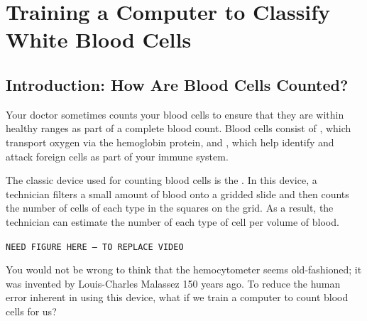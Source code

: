 \chapter[Training a Computer to Classify White Blood Cells]{Training a Computer to Classify White Blood Cells}
\label{chapter:white_blood_cells}
\renewcommand{\chaptertitle}{Training a Computer to Classify White Blood Cells}



\FloatBarrier

\section{Introduction: How Are Blood Cells Counted?}
\label{sec:introduction}

Your doctor sometimes counts your blood cells to ensure that they are within healthy ranges as part of a complete blood count. Blood cells consist of , which transport oxygen via the hemoglobin protein, and , which help identify and attack foreign cells as part of your immune system.

The classic device used for counting blood cells is the . In this device, a technician filters a small amount of blood onto a gridded slide and then counts the number of cells of each type in the squares on the grid. As a result, the technician can estimate the number of each type of cell per volume of blood.

\texttt{NEED FIGURE HERE -- TO REPLACE VIDEO}\\

\begin{qbox}\end{qbox}

You would not be wrong to think that the hemocytometer seems old-fashioned; it was invented by Louis-Charles Malassez 150 years ago. To reduce the human error inherent in using this device, what if we train a computer to count blood cells for us?

